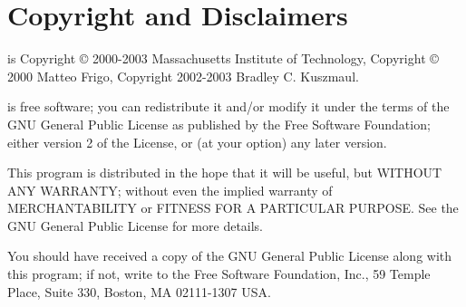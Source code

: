 \chapter{Copyright and Disclaimers}
\label{app:copyright}

{\sysnameversion} is Copyright \copyright{} 2000-2003 Massachusetts
Institute of Technology, Copyright \copyright{} 2000 Matteo Frigo,
Copyright 2002-2003 Bradley C. Kuszmaul.

{\sysnameversion} is free software; you can redistribute it and/or modify
it under the terms of the GNU General Public License as published by
the Free Software Foundation; either version 2 of the License, or
(at your option) any later version.

This program is distributed in the hope that it will be useful,
but WITHOUT ANY WARRANTY; without even the implied warranty of
MERCHANTABILITY or FITNESS FOR A PARTICULAR PURPOSE.  See the
GNU General Public License for more details.

You should have received a copy of the GNU General Public License
along with this program; if not, write to the Free Software
Foundation, Inc., 59 Temple Place, Suite 330, Boston, MA 02111-1307
USA.

